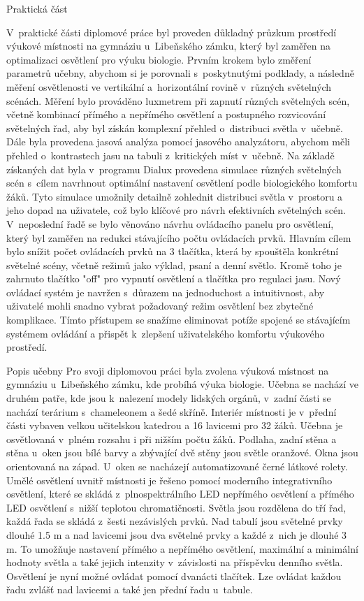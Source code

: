 \chap Praktická část

V~praktické části diplomové práce byl proveden důkladný průzkum prostředí výukové místnosti na gymnáziu u~Libeňského zámku,
který byl zaměřen na optimalizaci osvětlení pro výuku biologie.
Prvním krokem bylo změření parametrů učebny, abychom si je porovnali s~poskytnutými podklady, a následně měření
osvětlenosti ve vertikální a~horizontální rovině v~různých světelných scénách.
Měření bylo prováděno luxmetrem při zapnutí různých světelných scén, včetně kombinací přímého a nepřímého osvětlení
a postupného rozvicování světelných řad,
 aby byl získán komplexní přehled o~distribuci světla v~učebně.
\medskip
Dále byla provedena jasová analýza pomocí jasového analyzátoru, abychom měli přehled o~kontrastech jasu na tabuli
z~kritických míst v~učebně.
\medskip
Na základě získaných dat byla v~programu Dialux provedena simulace různých světelných scén s~cílem navrhnout optimální
nastavení osvětlení podle biologického komfortu žáků.
Tyto simulace umožnily detailně zohlednit distribuci světla v~prostoru a jeho dopad na uživatele, což bylo
klíčové pro návrh efektivních světelných scén.
\medskip
V~neposlední řadě se bylo věnováno návrhu ovládacího panelu pro osvětlení, který byl zaměřen na redukci stávajícího
počtu ovládacích prvků.
\medskip
Hlavním cílem bylo snížit počet ovládacích prvků na 3 tlačítka, která by spouštěla konkrétní světelné scény,
včetně režimů jako výklad, psaní a denní světlo. Kromě toho je zahrnuto tlačítko "off" pro vypnutí osvětlení a tlačítka pro regulaci jasu.
\medskip
Nový ovládací systém je navržen s~důrazem na jednoduchost a intuitivnost, aby uživatelé mohli snadno vybrat
požadovaný režim osvětlení bez zbytečné komplikace. Tímto přístupem se snažíme eliminovat potíže spojené
se stávajícím systémem ovládání a přispět k~zlepšení uživatelského komfortu výukového prostředí.

\sec Popis učebny
Pro svoji diplomovou práci byla zvolena výuková místnost na gymnáziu u~Libeňského zámku, kde probíhá výuka
biologie. Učebna se nachází ve druhém patře, kde jsou k~nalezení modely lidských orgánů, v~zadní části se nachází
 terárium s~chameleonem a šedé skříně. Interiér místnosti je v~přední části vybaven velkou učitelskou katedrou
  a 16 lavicemi pro 32 žáků. Učebna je osvětlovaná v~plném rozsahu i při nižším počtu žáků. Podlaha, zadní stěna a stěna u~oken jsou bílé barvy a zbývající dvě stěny jsou světle oranžové. Okna jsou orientovaná na západ. U~oken se nacházejí automatizované černé látkové rolety.
\medskip
Umělé osvětlení uvnitř místnosti je řešeno pomocí moderního integrativního osvětlení, které se skládá
 z~plnospektrálního LED nepřímého osvětlení a přímého LED osvětlení s~nižší teplotou chromatičnosti.
Světla jsou rozdělena do tří řad, každá řada se skládá z~šesti nezávislých prvků.
Nad tabulí jsou světelné prvky dlouhé 1.5 m a nad lavicemi jsou dva světelné prvky a každé z~nich je dlouhé 3 m.
To umožňuje nastavení přímého a nepřímého osvětlení, maximální a minimální hodnoty světla
a také jejich intenzity v~závislosti na příspěvku denního světla.
Osvětlení je nyní možné ovládat pomocí dvanácti tlačítek. Lze ovládat každou řadu zvlášť nad lavicemi
a také jen přední řadu u~tabule.


